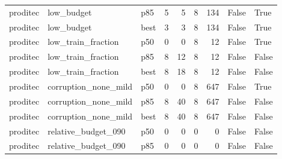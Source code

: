 \begin{tabular}{lllrrrrll}
proditec &           low\_budget &    p85 &                   5 &                 5 &                    8 &                          134 &                                        False &                                 True \\
proditec &           low\_budget &   best &                   3 &                 3 &                    8 &                          134 &                                        False &                                 True \\
proditec &   low\_train\_fraction &    p50 &                   0 &                 0 &                    8 &                           12 &                                        False &                                 True \\
proditec &   low\_train\_fraction &    p85 &                   8 &                12 &                    8 &                           12 &                                        False &                                False \\
proditec &   low\_train\_fraction &   best &                   8 &                18 &                    8 &                           12 &                                        False &                                False \\
proditec & corruption\_none\_mild &    p50 &                   0 &                 0 &                    8 &                          647 &                                        False &                                 True \\
proditec & corruption\_none\_mild &    p85 &                   8 &                40 &                    8 &                          647 &                                        False &                                False \\
proditec & corruption\_none\_mild &   best &                   8 &                40 &                    8 &                          647 &                                        False &                                False \\
proditec &  relative\_budget\_090 &    p50 &                   0 &                 0 &                    0 &                            0 &                                        False &                                False \\
proditec &  relative\_budget\_090 &    p85 &                   0 &                 0 &                    0 &                            0 &                                        False &                                False \\

\end{tabular}
